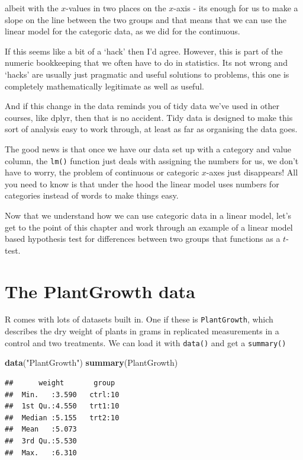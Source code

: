 \documentclass[
]{book}
\newenvironment{Shaded}{\begin{snugshade}}{\end{snugshade}}
\newcommand{\KeywordTok}[1]{\textcolor[rgb]{0.13,0.29,0.53}{\textbf{#1}}}
\newcommand{\NormalTok}[1]{#1}
\newcommand{\StringTok}[1]{\textcolor[rgb]{0.31,0.60,0.02}{#1}}
\begin{document}
albeit with the \(x\)-values in two places on the \(x\)-axis - its enough for us to make a slope on the line between the two groups and that means that we can use the linear model for the categoric data, as we did for the continuous.

If this seems like a bit of a `hack' then I'd agree. However, this is part of the numeric bookkeeping that we often have to do in statistics. Its not wrong and `hacks' are usually just pragmatic and useful solutions to problems, this one is completely mathematically legitimate as well as useful.

And if this change in the data reminds you of tidy data we've used in other courses, like dplyr, then that is no accident. Tidy data is designed to make this sort of analysis easy to work through, at least as far as organising the data goes.

The good news is that once we have our data set up with a category and value column, the \texttt{lm()} function just deals with assigning the numbers for us, we don't have to worry, the problem of continuous or categoric \(x\)-axes just disappears! All you need to know is that under the hood the linear model uses numbers for categories instead of words to make things easy.

Now that we understand how we can use categoric data in a linear model, let's get to the point of this chapter and work through an example of a linear model based hypothesis test for differences between two groups that functions as a \(t\)-test.

\hypertarget{the-plantgrowth-data}{%
\section{The PlantGrowth data}\label{the-plantgrowth-data}}

R comes with lots of datasets built in. One if these is \texttt{PlantGrowth}, which describes the dry weight of plants in grams in replicated measurements in a control and two treatments. We can load it with \texttt{data()} and get a \texttt{summary()}

\begin{Shaded}
\begin{Highlighting}[]
\KeywordTok{data}\NormalTok{(}\StringTok{"PlantGrowth"}\NormalTok{)}
\KeywordTok{summary}\NormalTok{(PlantGrowth)}
\end{Highlighting}
\end{Shaded}

\begin{verbatim}
##      weight       group   
##  Min.   :3.590   ctrl:10  
##  1st Qu.:4.550   trt1:10  
##  Median :5.155   trt2:10  
##  Mean   :5.073            
##  3rd Qu.:5.530            
##  Max.   :6.310
\end{verbatim}
\end{document}
